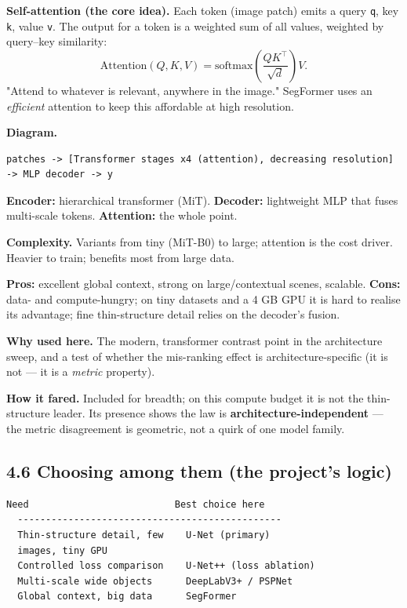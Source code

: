 \documentclass[11pt]{article}
\begin{document}
\textbf{Self-attention (the core idea).} Each token (image patch) emits a query \texttt{q}, key \texttt{k}, value \texttt{v}. The output for a token is a weighted sum of all values, weighted by query--key similarity: \[\text{Attention}(Q,K,V) = \text{softmax}\!\left(\frac{QK^\top}{\sqrt{d}}\right)V.\] "Attend to whatever is relevant, anywhere in the image." SegFormer uses an \textit{efficient} attention to keep this affordable at high resolution.

\textbf{Diagram.}
\begin{Verbatim}[breaklines=true,breakanywhere=true,fontsize=\footnotesize]
  patches -> [Transformer stages x4 (attention), decreasing resolution] -> MLP decoder -> y
\end{Verbatim}

\textbf{Encoder:} hierarchical transformer (MiT). \textbf{Decoder:} lightweight MLP that fuses multi-scale tokens. \textbf{Attention:} the whole point.

\textbf{Complexity.} Variants from tiny (MiT-B0) to large; attention is the cost driver. Heavier to train; benefits most from large data.

\textbf{Pros:} excellent global context, strong on large/contextual scenes, scalable. \textbf{Cons:} data- and compute-hungry; on tiny datasets and a 4 GB GPU it is hard to realise its advantage; fine thin-structure detail relies on the decoder's fusion.

\textbf{Why used here.} The modern, transformer contrast point in the architecture sweep, and a test of whether the mis-ranking effect is architecture-specific (it is not --- it is a \textit{metric} property).

\textbf{How it fared.} Included for breadth; on this compute budget it is not the thin-structure leader. Its presence shows the law is \textbf{architecture-independent} --- the metric disagreement is geometric, not a quirk of one model family.

\subsection*{4.6 Choosing among them (the project's logic)}

\begin{Verbatim}[breaklines=true,breakanywhere=true,fontsize=\footnotesize]
  Need                          Best choice here
  -----------------------------------------------
  Thin-structure detail, few    U-Net (primary)
  images, tiny GPU
  Controlled loss comparison    U-Net++ (loss ablation)
  Multi-scale wide objects      DeepLabV3+ / PSPNet
  Global context, big data      SegFormer
\end{Verbatim}
\end{document}
